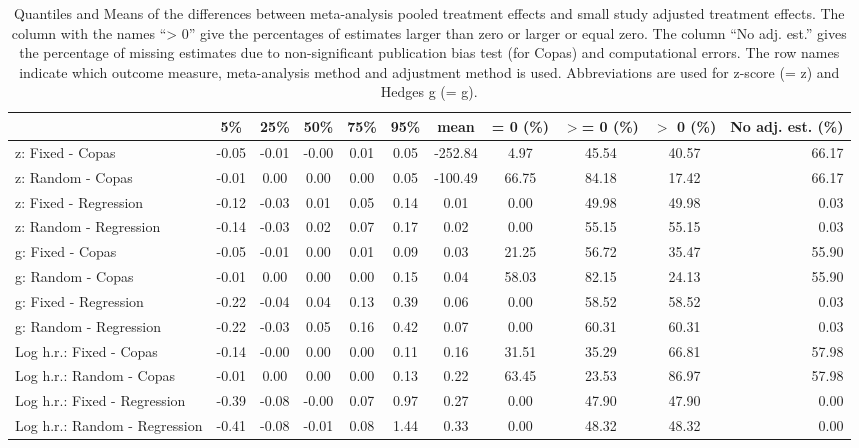 \documentclass[11pt,a4paper,twoside]{book}\usepackage[]{graphicx}\usepackage[]{color}
\begin{document}
\begin{table}[ht]
\centering
\begingroup\scriptsize
\begin{tabular}{lcccccccccr}
  \hline
 & 5\% & 25\% & 50\% & 75\% & 95\% & mean & = 0 (\%) & $>$= 0 (\%) & $>$ 0 (\%) & No adj. est. (\%) \\ 
  \hline
z: Fixed - Copas & -0.05 & -0.01 & -0.00 & 0.01 & 0.05 & -252.84 & 4.97 & 45.54 & 40.57 & 66.17 \\ 
  z: Random - Copas & -0.01 & 0.00 & 0.00 & 0.00 & 0.05 & -100.49 & 66.75 & 84.18 & 17.42 & 66.17 \\ 
  z: Fixed - Regression & -0.12 & -0.03 & 0.01 & 0.05 & 0.14 & 0.01 & 0.00 & 49.98 & 49.98 & 0.03 \\ 
  z: Random - Regression & -0.14 & -0.03 & 0.02 & 0.07 & 0.17 & 0.02 & 0.00 & 55.15 & 55.15 & 0.03 \\ 
  g: Fixed - Copas & -0.05 & -0.01 & 0.00 & 0.01 & 0.09 & 0.03 & 21.25 & 56.72 & 35.47 & 55.90 \\ 
  g: Random - Copas & -0.01 & 0.00 & 0.00 & 0.00 & 0.15 & 0.04 & 58.03 & 82.15 & 24.13 & 55.90 \\ 
  g: Fixed - Regression & -0.22 & -0.04 & 0.04 & 0.13 & 0.39 & 0.06 & 0.00 & 58.52 & 58.52 & 0.03 \\ 
  g: Random - Regression & -0.22 & -0.03 & 0.05 & 0.16 & 0.42 & 0.07 & 0.00 & 60.31 & 60.31 & 0.03 \\ 
  Log h.r.: Fixed - Copas & -0.14 & -0.00 & 0.00 & 0.00 & 0.11 & 0.16 & 31.51 & 35.29 & 66.81 & 57.98 \\ 
  Log h.r.: Random - Copas & -0.01 & 0.00 & 0.00 & 0.00 & 0.13 & 0.22 & 63.45 & 23.53 & 86.97 & 57.98 \\ 
  Log h.r.: Fixed - Regression & -0.39 & -0.08 & -0.00 & 0.07 & 0.97 & 0.27 & 0.00 & 47.90 & 47.90 & 0.00 \\ 
  Log h.r.: Random - Regression & -0.41 & -0.08 & -0.01 & 0.08 & 1.44 & 0.33 & 0.00 & 48.32 & 48.32 & 0.00 \\ 
   \hline
\end{tabular}
\endgroup
\caption{Quantiles and Means of the differences between meta-analysis pooled treatment effects and small study adjusted treatment effects. The column with the names ``> 0'' give the percentages of estimates larger than zero or larger or equal zero. The column ``No adj. est.'' gives the percentage of missing estimates due to non-significant publication bias test (for Copas) and computational errors. The row names indicate which outcome measure, meta-analysis method and adjustment method is used. Abbreviations are used for z-score (= z) and Hedges g (= g).} 
\label{adjustment.difference}
\end{table}
\end{document}
